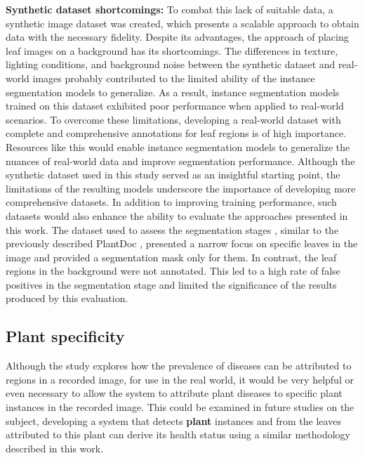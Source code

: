 \documentclass[draft,final]{vutinfth} %
\begin{document}
\textbf{Synthetic dataset shortcomings:} To combat this lack of suitable data, a synthetic image dataset was created, which presents a scalable approach to obtain data with the necessary fidelity. 
Despite its advantages, the approach of placing leaf images on a background has its shortcomings. The differences in texture, lighting conditions, and background noise between the synthetic dataset and real-world images probably contributed to the limited ability of the instance segmentation models to generalize. As a result, instance segmentation models trained on this dataset exhibited poor performance when applied to real-world scenarios.
To overcome these limitations, developing a real-world dataset with complete and comprehensive annotations for leaf regions is of high importance. Resources like this would enable instance segmentation models to generalize the nuances of real-world data and improve segmentation performance. Although the synthetic dataset used in this study served as an insightful starting point, the limitations of the resulting models underscore the importance of developing more comprehensive datasets.
In addition to improving training performance, such datasets would also enhance the ability to evaluate the approaches presented in this work. The dataset used to assess the segmentation stages \cite{giovi_leaf_2024}, similar to the previously described PlantDoc \cite{singh_plantdoc_2020}, presented a narrow focus on specific leaves in the image and provided a segmentation mask only for them. In contrast, the leaf regions in the background were not annotated. This led to a high rate of false positives in the segmentation stage and limited the significance of the results produced by this evaluation. 
\fi

\subsection{Plant specificity} 
Although the study explores how the prevalence of diseases can be attributed to regions in a recorded image, for use in the real world, it would be very helpful or even necessary to allow the system to attribute plant diseases to specific plant instances in the recorded image. This could be examined in future studies on the subject, developing a system that detects \textbf{plant} instances and from the leaves attributed to this plant can derive its health status using a similar methodology described in this work.
\end{document}
